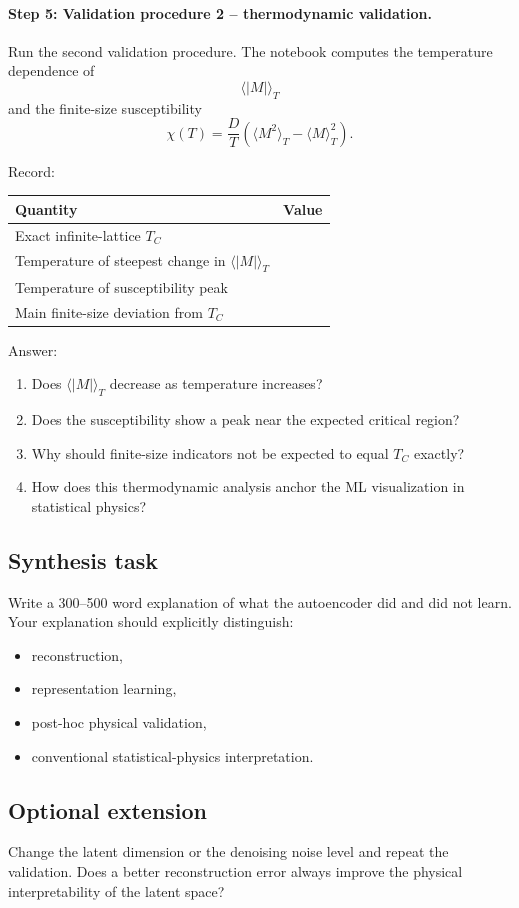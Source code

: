 \paragraph{Step 5: Validation procedure 2 -- thermodynamic validation.}
Run the second validation procedure. The notebook computes the temperature dependence of
\[
\langle |M| \rangle_T
\]
and the finite-size susceptibility
\[
\chi(T)=\frac{D}{T}\left(\langle M^2\rangle_T-\langle M\rangle_T^2\right).
\]

Record:
\begin{center}
\begin{tabular}{l l}
\hline
Quantity & Value \\
\hline
Exact infinite-lattice \(T_C\) & \\
Temperature of steepest change in \(\langle |M| \rangle_T\) & \\
Temperature of susceptibility peak & \\
Main finite-size deviation from \(T_C\) & \\
\hline
\end{tabular}
\end{center}

Answer:
\begin{enumerate}
    \item Does \(\langle |M| \rangle_T\) decrease as temperature increases?
    \item Does the susceptibility show a peak near the expected critical region?
    \item Why should finite-size indicators not be expected to equal \(T_C\) exactly?
    \item How does this thermodynamic analysis anchor the ML visualization in statistical physics?
\end{enumerate}

\subsection*{Synthesis task}
Write a 300--500 word explanation of what the autoencoder did and did not learn. Your explanation should explicitly distinguish:
\begin{itemize}
    \item reconstruction,
    \item representation learning,
    \item post-hoc physical validation,
    \item conventional statistical-physics interpretation.
\end{itemize}

\subsection*{Optional extension}
Change the latent dimension or the denoising noise level and repeat the validation. Does a better reconstruction error always improve the physical interpretability of the latent space?
